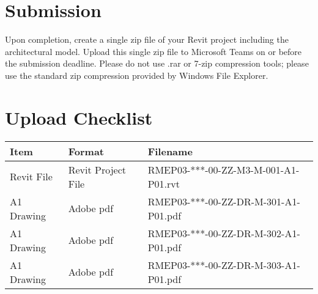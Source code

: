 \section*{Submission}
Upon completion, create a single zip file of your Revit project including the architectural model. Upload this single zip file to Microsoft Teams on or before the submission deadline.  Please do not use .rar or 7-zip compression tools; please use the standard zip compression provided by Windows File Explorer.

\section*{Upload Checklist}

\begin{tabular}{|l|l|l|}
	\hline
	\textbf{Item} & \textbf{Format} & \textbf{Filename} \\
	\hline
	Revit File  & Revit Project File & RMEP03-***-00-ZZ-M3-M-001-A1-P01.rvt \\
	A1 Drawing  & Adobe pdf & RMEP03-***-00-ZZ-DR-M-301-A1-P01.pdf  \\
	A1 Drawing  & Adobe pdf & RMEP03-***-00-ZZ-DR-M-302-A1-P01.pdf  \\
	A1 Drawing  & Adobe pdf & RMEP03-***-00-ZZ-DR-M-303-A1-P01.pdf  \\
	\hline
\end{tabular}

